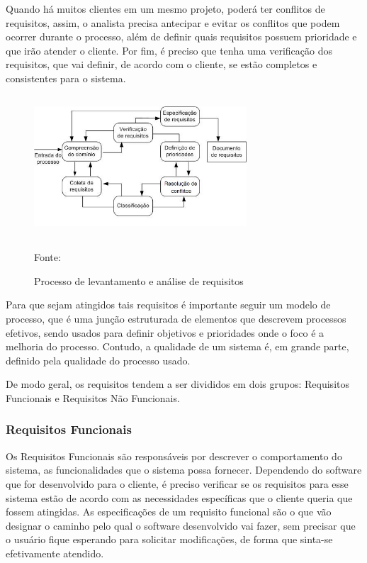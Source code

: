 Quando há muitos clientes em um mesmo projeto, poderá ter conflitos de requisitos, assim, o analista precisa antecipar e evitar os conflitos que podem ocorrer durante o processo, além de definir quais requisitos possuem prioridade e que irão atender o cliente. Por fim, é preciso que tenha uma verificação dos requisitos, que vai definir, de acordo com o cliente, se estão completos e consistentes para o sistema.

\begin{figure}[!h]
	\centering
	\caption{Processo de levantamento e análise de requisitos }
	\includegraphics[width=300px, height=200px]{./images/2-10.jpg}
		\par{Fonte: \cite{sommerville}}
\end{figure}

Para que sejam atingidos tais requisitos é importante seguir um modelo de processo, que é uma junção estruturada de elementos que descrevem processos efetivos, sendo usados para definir objetivos e prioridades onde o foco é a melhoria do processo. Contudo, a qualidade de um sistema é, em grande parte, definido pela qualidade do processo usado.

De modo geral, os requisitos tendem a ser divididos em dois grupos: Requisitos Funcionais e Requisitos Não Funcionais.

\subsubsection{Requisitos Funcionais}

Os Requisitos Funcionais são responsáveis por descrever o comportamento do sistema, as funcionalidades que o sistema possa fornecer. Dependendo do software que for desenvolvido para o cliente, é preciso verificar se os requisitos para esse sistema estão de acordo com as necessidades específicas que o cliente queria que fossem atingidas. As especificações de um requisito funcional são o que vão designar o caminho pelo qual o software desenvolvido vai fazer, sem precisar que o usuário fique esperando para solicitar modificações, de forma que sinta-se efetivamente atendido.

